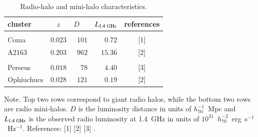 \documentclass[useAMS,usenatbib]{mn2e}
\def\del#1{{}}
\begin{document}
\begin{table} 
\begin{center}
\caption{Radio-halo and mini-halo characteristics.}
\medskip
\begin{tabular}{lcrrc}
\hline
\phantom{\Big|}
 cluster & $z$ & $D$~~ & $L_{1.4~{\mathrm{GHz}}}$ & references \\
\hline \\[-0.5em]
Coma           & $0.023$ & $101$ & $0.72$  &  [1]   \\
A2163         & $0.203$ & $962$ & $15.36$  &  [2]  \\
\hline \\[-0.5em]
Perseus        & $0.018$ & $78$   & $4.40$ &  [3]  \\
Ophiuchucs     & $0.028$ & $121$  & $0.19$  &  [2] \\[0.5em]
\hline
\end{tabular}
\label{tab:RadioHalos}
\end{center}
\footnotesize{Note. Top two rows correspond to giant radio halos, while the
  bottom two rows are radio mini-halos.  $D$ is the luminosity distance in units
  of $h_{70}^{-1}$~Mpc and $L_{1.4~{\mathrm{GHz}}}$ is the observed radio luminosity
  at 1.4~GHz in units of $10^{31}$~$h_{70}^{-2}$~erg~s$^{-1}$~Hz$^{-1}$.
  References: [1] \cite{1997A&A...321...55D} [2] \cite{2009A&A...499..679M} [3]
  \cite{1990MNRAS.246..477P}.}
\end{table}

\del{$M_{200}$ and $R_{200}$ are taken from \cite{2002ApJ...567..716R}. }
\end{document}
